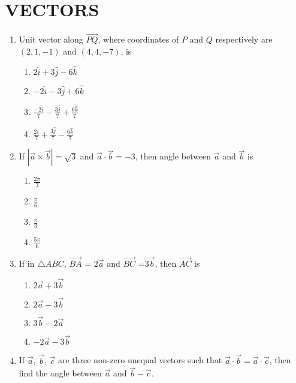 \documentclass{article}
\begin{document}
\section{VECTORS}
\begin{enumerate}
\item Unit vector along $\overrightarrow{PQ}$, where coordinates of $P$ and $Q$ respectively are $(2, 1, -1)$ and $(4, 4, -7)$, is
\begin{enumerate}
\item ${2\hat{i} + 3\hat{j} - 6\hat{k}}$
\item ${-2\hat{i} - 3\hat{j} + 6\hat{k}}$
\item $\frac{-2\hat{i}}{7} -\frac{3\hat{j}}{7} +\frac{6\hat{k}}{7}$
\item $\frac{2\hat{i}}{7} + \frac{3\hat{j}}{7} - \frac{6\hat{k}}{7}$
\end{enumerate}



\item If $|\overrightarrow{a} \times \overrightarrow{b}| = \sqrt{3}$ and $\overrightarrow{a} \cdot \overrightarrow{b} = -3$, then angle between $\overrightarrow{a}$ and $\overrightarrow{b}$ is
\begin{enumerate}
\item $\frac{2\pi}{3}$
\item $\frac{\pi}{6}$
\item $\frac{\pi}{3}$
\item $\frac{5\pi}{6}$
\end{enumerate}

\item If in $\triangle ABC$, $\overrightarrow{BA}$ = $2\overrightarrow{a}$ and $\overrightarrow{BC}$ =$ 3\overrightarrow{b}$, then $\overrightarrow{AC}$ is
\begin{enumerate}
\item $2\overrightarrow{a} + 3\overrightarrow{b}$
\item $2\overrightarrow{a} - 3\overrightarrow{b}$
\item $3\overrightarrow{b} - 2\overrightarrow{a}$
\item $-2\overrightarrow{a} - 3\overrightarrow{b}$
\end{enumerate}

\item  If $\overrightarrow{a}$, $\overrightarrow{b}$, $\overrightarrow{c}$ are three non-zero unequal vectors such that $\overrightarrow{a} \cdot \overrightarrow{b} = \overrightarrow{a} \cdot \overrightarrow{c}$, then find the angle between $\overrightarrow{a}$ and $\overrightarrow{b}-\overrightarrow{c}$.
\end{enumerate}
\end{document}

